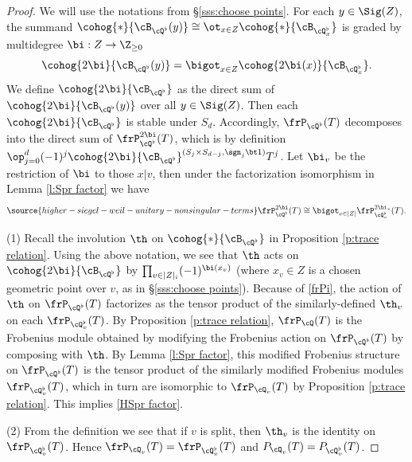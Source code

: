 \begin{proof} We will use the notations from \S\ref{sss:choose points}. For each $y\in \Sig(Z)$, the summand $\cohog{*}{\cB_{\cQ^{\flat}}(y)}\cong \ot_{x\in Z}\cohog{*}{\cB_{\cQ^{\flat}_{x}}}$ is graded by multidegree $\bi: Z\to \Z_{\ge0}$
\begin{equation*}
\cohog{2\bi}{\cB_{\cQ^{\flat}}(y)}=\bigot_{x\in Z}\cohog{2\bi(x)}{\cB_{\cQ^{\flat}_{x}}}.
\end{equation*}
We define $\cohog{2\bi}{\cB_{\cQ^{\flat}}}$ as the direct sum of  $\cohog{2\bi}{\cB_{\cQ^{\flat}}(y)}$ over all $y\in \Sig(Z)$. Then each $\cohog{2\bi}{\cB_{\cQ^{\flat}}}$ is stable under $S_{d}$. Accordingly, $\frP_{\cQ^{\flat}}(T)$ decomposes into the direct sum of $\frP^{2\bi}_{\cQ^{\flat}}(T)$, which is by definition $\op_{j=0}^{d}(-1)^{j}\cohog{2\bi}{\cB_{\cQ^{\flat}}}^{(S_{j}\times S_{d-j}, \sgn_{j}\bt1)}T^{j}$. Let $\bi_{v}$ be the restriction of $\bi$ to those $x|v$, then under the factorization isomorphism in Lemma \ref{l:Spr factor} we have
\begin{equation}\label{frPi}
\source{higher-siegel-weil-unitary-nonsingular-terms}
\frP^{2\bi}_{\cQ^{\flat}}(T)\cong \bigot_{v\in |Z|} \frP^{2\bi_{v}}_{\cQ^{\flat}_{v}}(T).
\end{equation}

(1) Recall the involution $\th$  on $\cohog{*}{\cB_{\cQ^{\flat}}}$ in Proposition \ref{p:trace relation}. Using the above notation,  we see that $\th$ acts on $\cohog{2\bi}{\cB_{\cQ^{\flat}}}$ by $\prod_{v\in |
Z|_{i}}(-1)^{\bi(x_{v})}$ (where $x_{v}\in Z$ is a chosen geometric point over $v$, as in \S\ref{sss:choose points}). Because of \eqref{frPi}, the action of $\th$ on $\frP_{\cQ^{\flat}}(T)$ factorizes as the tensor product of the similarly-defined $\th_{v}$ on each $\frP_{\cQ^{\flat}_{v}}(T)$. By Proposition \ref{p:trace relation}, $\frP_{\cQ}(T)$ is the Frobenius module obtained by modifying the Frobenius action on $\frP_{\cQ^{\flat}}(T)$ by composing with $\th$. By Lemma \ref{l:Spr factor}, this modified Frobenius structure on  $\frP_{\cQ^{\flat}}(T)$ is the tensor product of the similarly modified Frobenius modules $\frP_{\cQ^{\flat}_{v}}(T)$, which in turn are isomorphic to $\frP_{\cQ_{v}}(T)$ by Proposition \ref{p:trace relation}. This implies \eqref{HSpr factor}.

(2) From the definition we see that if $v$ is split, then $\th_{v}$ is the identity on $\frP_{\cQ^{\flat}_{v}}(T)$. Hence $\frP_{\cQ_{v}}(T)=\frP_{\cQ^{\flat}_{v}}(T)$ and $P_{\cQ_{v}}(T)=P_{\cQ^{\flat}_{v}}(T)$.


\end{proof}
